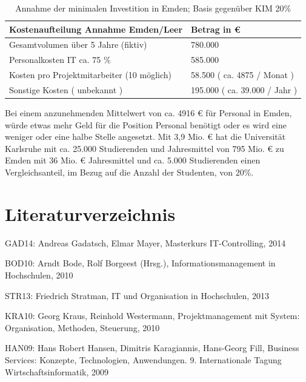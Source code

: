 \documentclass[a4paper]{article}
\begin{document}
\begin{table}
\centering
\begin{tabular}{|m{7.5490003cm}|m{5.065cm}|}

\hline
{\sffamily\bfseries\color{black} Kostenaufteilung Annahme Emden/Leer} &
{\sffamily\bfseries\color{black} Betrag in €}\\\hline
{\sffamily\color{black} Gesamtvolumen über 5 Jahre (fiktiv)} &
{\sffamily\color{black} 780.000}\\\hline
{\sffamily\color{black} Personalkosten IT ca. 75 \%} &
{\sffamily\color{black} 585.000}\\\hline
{\sffamily\color{black} Kosten pro Projektmitarbeiter (10 möglich)} &
{\sffamily\color{black} 58.500 ( ca. 4875 / Monat )}\\\hline
{\sffamily\color{black} Sonstige Kosten ( unbekannt )} &
{\sffamily\color{black} 195.000 ( ca. 39.000 / Jahr )}\\\hline\end{tabular}
\caption{Annahme der minimalen Investition in Emden; Basis gegenüber KIM 20\%}

\end{table}

\bigskip

{\sffamily
Bei einem anzunehmenden Mittelwert von ca. 4916 € für Personal in Emden, würde etwas mehr Geld für die Position Personal
benötigt oder es wird eine weniger oder eine halbe Stelle angesetzt. Mit 3,9 Mio. € hat die Universität Karlsruhe mit
ca. 25.000 Studierenden und Jahresmittel von 795 Mio. € zu Emden mit 36 Mio. € Jahresmittel und ca. 5.000 Studierenden
einen Vergleichsanteil, im Bezug auf die Anzahl der Studenten, von 20\%.}

\clearpage\section{Literaturverzeichnis}
{\sffamily
GAD14: Andreas Gadatsch, Elmar Mayer, Masterkurs IT-Controlling, 2014}

{\sffamily
BOD10: Arndt Bode, Rolf Borgeest (Hrsg.), Informationsmanagement in Hochschulen, 2010}

{\sffamily
STR13: Friedrich Stratman, IT und Organisation in Hochschulen, 2013}

{\sffamily
KRA10: Georg Kraus, Reinhold Westermann, Projektmanagement mit System: Organisation, Methoden, Steuerung, 2010}

{\sffamily
HAN09: Hans Robert Hansen, Dimitris Karagiannis, Hans-Georg Fill, Business Services: Konzepte, Technologien,
Anwendungen. 9. Internationale Tagung Wirtschaftsinformatik, 2009}
\end{document}
